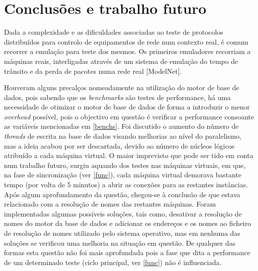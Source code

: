 
\section{Conclusões e trabalho futuro}

Dada a complexidade e as dificuldades associadas ao teste de
protocolos distribuídos para controlo de equipamentos de rede num
contexto real, é comum recorrer a emulação para teste dos mesmos. Os
primeiros emuladores recorriam a máquinas reais, interligadas através
de um sistema de emulação do tempo de trânsito e da perda de pacotes
numa rede real [ModelNet].


Houveram alguns precalços nomeadamente na utilização do motor de base de dados, pois sabendo que os \textit{benchmarks} são testes de performance, há uma necessidade de otimizar o motor de base de dados de forma a introduzir o menor \textit{overhead} possível, pois o objectivo em questão é verificar a performance consoante as variáveis mencionadas em \ref{benchs}. Foi discutido o aumento do número de \textit{threads} de escrita na base de dados visando melhorias ao nível do paralelismo, mas a ideia acabou por ser descartada, devido ao número de núcleos lógicos atribuído a cada máquina virtual. O maior imprevisto que pode ser tido em conta num trabalho futuro, surgiu aquando dos testes nas máquinas virtuais, em que, na fase de sincronização (ver \ref{func}), cada máquina virtual demorava bastante tempo (por volta de 5 minutos) a abrir as conexões para as restantes instâncias. Após algum aprofundamento da questão, chegou-se à conclusão de que estava relacionado com a resolução de nomes das restantes máquinas. Foram implementadas algumas possíveis soluções, tais como, desativar a resolução de nomes do motor da base de dados e adicionar os endereços e os nomes ao ficheiro de resolução de nomes utilizado pelo sistema operativo, mas em nenhuma das soluções se verificou uma melhoria na situação em questão. De qualquer das formas esta questão não foi mais aprofundada pois a fase que dita a performance de um determinado teste (ciclo principal, ver \ref{func}) não é influenciada.
